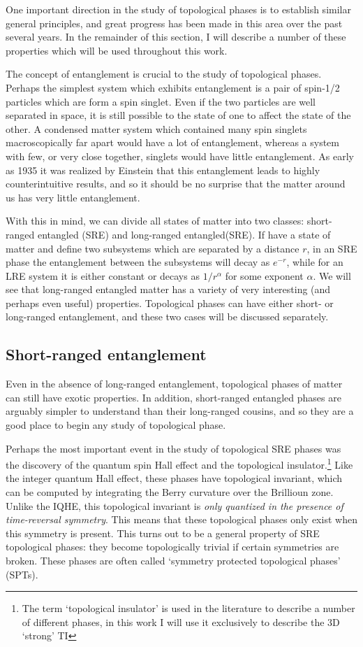 One important direction in the study of topological phases is to establish similar general principles, and great progress has been made in this area over the past several years. In the remainder of this section, I will describe a number of these properties which will be used throughout this work.

The concept of entanglement is crucial to the study of topological phases. Perhaps the simplest system which exhibits entanglement is a pair of spin-1/2 particles which are form a spin singlet. Even if the two particles are well separated in space, it is still possible to the state of one to affect the state of the other. A condensed matter system which contained many spin singlets macroscopically far apart would have a lot of entanglement, whereas a system with few, or very close together, singlets would have little entanglement. As early as 1935 it was realized by Einstein\cite{EPR} that this entanglement leads to highly counterintuitive results, and so it should be no surprise that the matter around us has very little entanglement.

With this in mind, we can divide all states of matter into two classes: short-ranged entangled (SRE) and long-ranged entangled(SRE). If have a state of matter and define two subsystems which are separated by a distance $r$, in an SRE phase the entanglement between the subsystems will decay as $e^{-r}$, while for an LRE system it is either constant or decays as $1/r^{\alpha}$ for some exponent $\alpha$. We will see that long-ranged entangled matter has a variety of very interesting (and perhaps even useful) properties. Topological phases can have either short- or long-ranged entanglement, and these two cases will be discussed separately.

\subsection{Short-ranged entanglement}

Even in the absence of long-ranged entanglement, topological phases of matter can still have exotic properties. In addition, short-ranged entangled phases are arguably simpler to understand than their long-ranged cousins, and so they are a good place to begin any study of topological phase.

Perhaps the most important event in the study of topological SRE phases was the discovery of the quantum spin Hall effect\cite{spinHallReview} and the topological insulator.\cite{KaneHasanRMP,QiZhangRMP}\footnote{The term `topological insulator' is used in the literature to describe a number of different phases, in this work I will use it exclusively to describe the 3D `strong' TI}
Like the integer quantum Hall effect, these phases have topological invariant, which can be computed by integrating the Berry curvature over the Brillioun zone. Unlike the IQHE, this topological invariant is \emph{only quantized in the presence of time-reversal symmetry}. This means that these topological phases only exist when this symmetry is present. This turns out to be a general property of SRE topological phases: they become topologically trivial if certain symmetries are broken. These phases are often called `symmetry protected topological phases' (SPTs).

